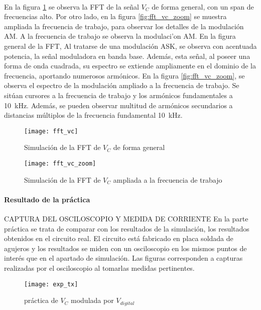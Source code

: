 \paragraph{}
En la figura \ref{fig:sim_fft} se observa la FFT de la señal $V_C$ de forma general, con un span de frecuencias alto. Por otro lado, en la figura \ref{fig:fft_vc_zoom} se muestra ampliada la frecuencia de trabajo, para observar los detalles de la modulación AM.
A la frecuencia de trabajo se observa la modulaci'on AM.
En la figura general de la FFT, Al tratarse de una modulación ASK, se observa con acentuada potencia, la señal moduladora en banda base. Además, esta señal, al poseer una forma de onda cuadrada, su espectro se extiende ampliamente en el dominio de la frecuencia, aportando numerosos armónicos.
En la figura \ref{fig:fft_vc_zoom}, se observa el espectro de la modulación ampliado a la frecuencia de trabajo. Se sitúan cursores a la frecuencia de trabajo y los armónicos fundamentales a \SI{10}{\kilo\hertz}. Además, se pueden observar multitud de armónicos secundarios a distancias múltiplos de la frecuencia fundamental \SI{10}{\kilo\hertz}.
\begin{figure}[h]
    \centering
    \texttt{[image: fft\_vc]}
    \caption{Simulaci\'on de la FFT de $V_C$ de forma general}
    \label{fig:sim_fft}
\end{figure}
\begin{figure}[h]
    \centering
    \texttt{[image: fft\_vc\_zoom]}
    \caption{Simulaci\'on de la FFT de $V_C$ ampliada a la frecuencia de trabajo}
    \label{fig:sim_fft_zoom}
\end{figure}

\paragraph{Resultado de la pr\'actica} CAPTURA DEL OSCILOSCOPIO Y MEDIDA DE CORRIENTE
En la parte práctica se trata de comparar con los resultados de la simulación, los resultados obtenidos en el circuito real. El circuito está fabricado en placa soldada de agujeros y los resultados se miden con un osciloscopio en los mismos puntos de interés que en el apartado de simulación. Las figuras corresponden a capturas realizadas por el osciloscopio al tomarlas medidas pertinentes.

\begin{figure}[h]
    \centering
    \texttt{[image: exp\_tx]}
    \caption{práctica de $V_C$ modulada por $V_{digital}$}
    \label{fig:sim_vc_vdig}
\end{figure}

